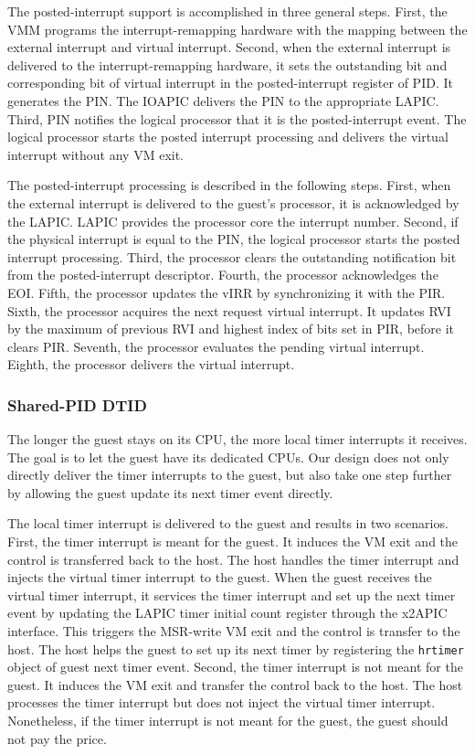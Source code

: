 The posted-interrupt support is accomplished in three general
steps. First, the VMM programs the interrupt-remapping
hardware with the mapping between the external interrupt and
virtual interrupt. Second, when the external interrupt is
delivered to the interrupt-remapping hardware, it sets the
outstanding bit and corresponding bit of virtual interrupt in
the posted-interrupt register of PID. It generates the PIN.
The IOAPIC delivers the PIN to the appropriate LAPIC. Third,
PIN notifies the logical processor that it is the
posted-interrupt event. The logical processor starts the
posted interrupt processing and delivers the virtual interrupt
without any VM exit.

The posted-interrupt processing is described in the following
steps. First, when the external interrupt is delivered to the
guest's processor, it is acknowledged by the LAPIC. LAPIC
provides the processor core the interrupt number. Second, if
the physical interrupt is equal to the PIN, the logical
processor starts the posted interrupt processing. Third, the
processor clears the outstanding notification bit from the
posted-interrupt descriptor. Fourth, the processor
acknowledges the EOI. Fifth, the processor updates the vIRR by
synchronizing it with the PIR. Sixth, the processor acquires
the next request virtual interrupt. It updates RVI by the
maximum of previous RVI and highest index of bits set in PIR,
before it clears PIR. Seventh, the processor evaluates the
pending virtual interrupt. Eighth, the processor delivers the
virtual interrupt.

\subsubsection{Shared-PID DTID} \label{subsubsec:shared_pid_dtid}
The longer the guest stays on its CPU, the more local timer
interrupts it receives. The goal is to let the guest have its
dedicated CPUs. Our design does not only directly deliver the
timer interrupts to the guest, but also take one step further
by allowing the guest update its next timer event directly.

The local timer interrupt is delivered to the guest and
results in two scenarios. First, the timer interrupt is meant
for the guest. It induces the VM exit and the control is
transferred back to the host. The host handles the timer
interrupt and injects the virtual timer interrupt to the
guest. When the guest receives the virtual timer interrupt, it
services the timer interrupt and set up the next timer event
by updating the LAPIC timer initial count register through the
x2APIC interface. This triggers the MSR-write VM exit and the
control is transfer to the host. The host helps the guest to
set up its next timer by registering the \texttt{hrtimer}
object of guest next timer event. Second, the timer interrupt
is not meant for the guest. It induces the VM exit and
transfer the control back to the host. The host processes the
timer interrupt but does not inject the virtual timer
interrupt. Nonetheless, if the timer interrupt is not meant
for the guest, the guest should not pay the price.

